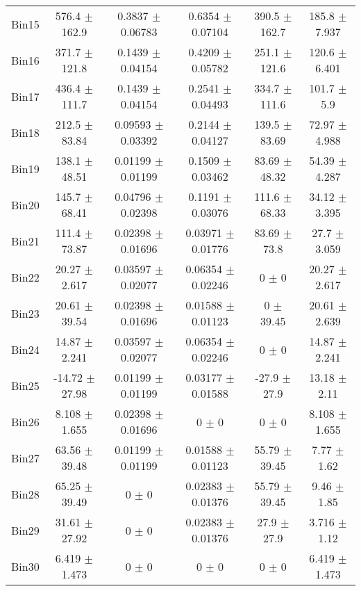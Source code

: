 \begin{tabular}{@{\extracolsep{4pt}}lccccc@{}}
     Bin15 & 576.4 $\pm$ 162.9 & 0.3837 $\pm$ 0.06783 & 0.6354 $\pm$ 0.07104 & 390.5 $\pm$ 162.7 & 185.8 $\pm$ 7.937 \\ 
     Bin16 & 371.7 $\pm$ 121.8 & 0.1439 $\pm$ 0.04154 & 0.4209 $\pm$ 0.05782 & 251.1 $\pm$ 121.6 & 120.6 $\pm$ 6.401 \\ 
     Bin17 & 436.4 $\pm$ 111.7 & 0.1439 $\pm$ 0.04154 & 0.2541 $\pm$ 0.04493 & 334.7 $\pm$ 111.6 & 101.7 $\pm$ 5.9 \\ 
     Bin18 & 212.5 $\pm$ 83.84 & 0.09593 $\pm$ 0.03392 & 0.2144 $\pm$ 0.04127 & 139.5 $\pm$ 83.69 & 72.97 $\pm$ 4.988 \\ 
     Bin19 & 138.1 $\pm$ 48.51 & 0.01199 $\pm$ 0.01199 & 0.1509 $\pm$ 0.03462 & 83.69 $\pm$ 48.32 & 54.39 $\pm$ 4.287 \\ 
     Bin20 & 145.7 $\pm$ 68.41 & 0.04796 $\pm$ 0.02398 & 0.1191 $\pm$ 0.03076 & 111.6 $\pm$ 68.33 & 34.12 $\pm$ 3.395 \\ 
     Bin21 & 111.4 $\pm$ 73.87 & 0.02398 $\pm$ 0.01696 & 0.03971 $\pm$ 0.01776 & 83.69 $\pm$ 73.8 & 27.7 $\pm$ 3.059 \\ 
     Bin22 & 20.27 $\pm$ 2.617 & 0.03597 $\pm$ 0.02077 & 0.06354 $\pm$ 0.02246 & 0 $\pm$ 0 & 20.27 $\pm$ 2.617 \\ 
     Bin23 & 20.61 $\pm$ 39.54 & 0.02398 $\pm$ 0.01696 & 0.01588 $\pm$ 0.01123 & 0 $\pm$ 39.45 & 20.61 $\pm$ 2.639 \\ 
     Bin24 & 14.87 $\pm$ 2.241 & 0.03597 $\pm$ 0.02077 & 0.06354 $\pm$ 0.02246 & 0 $\pm$ 0 & 14.87 $\pm$ 2.241 \\ 
     Bin25 & -14.72 $\pm$ 27.98 & 0.01199 $\pm$ 0.01199 & 0.03177 $\pm$ 0.01588 & -27.9 $\pm$ 27.9 & 13.18 $\pm$ 2.11 \\ 
     Bin26 & 8.108 $\pm$ 1.655 & 0.02398 $\pm$ 0.01696 & 0 $\pm$ 0 & 0 $\pm$ 0 & 8.108 $\pm$ 1.655 \\ 
     Bin27 & 63.56 $\pm$ 39.48 & 0.01199 $\pm$ 0.01199 & 0.01588 $\pm$ 0.01123 & 55.79 $\pm$ 39.45 & 7.77 $\pm$ 1.62 \\ 
     Bin28 & 65.25 $\pm$ 39.49 & 0 $\pm$ 0 & 0.02383 $\pm$ 0.01376 & 55.79 $\pm$ 39.45 & 9.46 $\pm$ 1.85 \\ 
     Bin29 & 31.61 $\pm$ 27.92 & 0 $\pm$ 0 & 0.02383 $\pm$ 0.01376 & 27.9 $\pm$ 27.9 & 3.716 $\pm$ 1.12 \\ 
     Bin30 & 6.419 $\pm$ 1.473 & 0 $\pm$ 0 & 0 $\pm$ 0 & 0 $\pm$ 0 & 6.419 $\pm$ 1.473 \\ 
\hline\hline
  \end{tabular}
